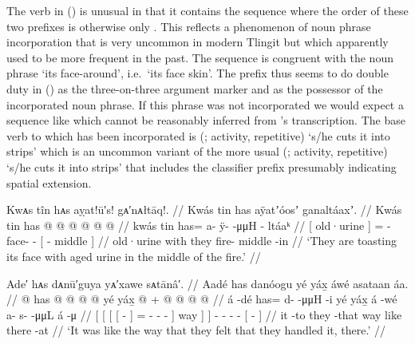 The verb in (\lastx) is unusual in that it contains the sequence  where the order of these two prefixes is otherwise only .
This reflects a phenomenon of noun phrase incorporation that is very uncommon in modern Tlingit but which apparently used to be more frequent in the past.
The sequence  is congruent with the noun phrase  ‘its face-around’, i.e.\ ‘its face skin’.
The  prefix thus seems to do double duty in (\lastx) as the three-on-three argument marker and as the possessor of the incorporated noun phrase.
If this phrase was not incorporated we would expect a sequence like  which cannot be reasonably inferred from \citeauthor{swanton:1909}’s transcription.
The base verb to which  has been incorporated is  (;  activity,  repetitive) ‘s/he cuts it into strips’ which is an uncommon variant of the more usual  (;  activity,  repetitive) ‘s/he cuts it into strips’ \parencite[01/65]{leer:1973} that includes the  classifier prefix presumably indicating spatial extension.

\ex\label{ex:91-179-roast-with-urine}%
%
\begingl
	\glpreamble	Kwᴀs tîn hᴀs aỵat!ū′s! gᴀ′nᴀłtāq!. //
	\glpreamble	Kwás tin has aÿatʼóosʼ ganaltáaxʼ. //
	\gla	{} Kwás tin {} has @  @ {} @ {} @ {}
		{}  @ {} @ {} {}  //
	\glb	{} kwás tin {} has= a- ÿ-  -μμH
		{} - ltáaᵏ {} {} //
	\glc	{}[ old·urine  {}]
		= - face-  -
		{}[ - middle \· {}] //
	\gld	{} old·urine with {} they  {} {} {}
		{} fire- middle -in {} //
	\glft	‘They are toasting its face with aged urine in the middle of the fire.’
		//
\endgl
\xe

\ex\label{ex:91-180-like-how-felt}%
%
\begingl
	\glpreamble	Ade′ hᴀs dᴀnū′guya yᴀ′xawe sᴀtānâ′. //
	\glpreamble	Aadé has danóogu yé yáx̱ áwé asataan áa. //
	\gla	{} {} {} {}  @ {} {}
			has @  @ {} @ {} @ {} {} yé {}
		yáx̱ {}  @ {} +
		 @ {} @ {} @ {}
		{}  @ {} {} //
	\glb	{} {} {} {} á -dé {}
			has= d-  -μμH -i {} yé {}
		yáx̱ {} á -wé
		a- s-  -μμL
		{} á -μ {} //
	\glc	{}[ {}[ {}[ {}[  - {}]
			= -  - - {}] way {}]
		 {}]  -
		- -  -
		{}[  - {}] //
	\gld	{} {} {} {} it -to {}
			they  {} {} -that {} way {}
		like {}  {}
		 {} {} {}
		{} there -at {} //
	\glft	‘It was like the way that they felt that they handled it, there.’
		//
\endgl
\xe

